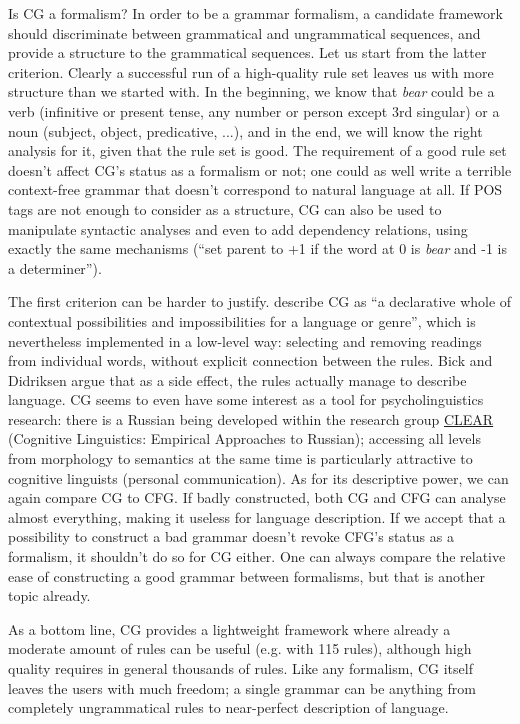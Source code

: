 Is CG a formalism? In order to be a grammar formalism, a candidate
framework should discriminate between grammatical and ungrammatical
sequences, and provide a structure to the grammatical sequences.
Let us start from the latter criterion. Clearly a successful run of a
high-quality rule set leaves us with more structure than we started
with. In the beginning, we know that \emph{bear} could be a verb
(infinitive or present tense, any number or person except 3rd
singular) or a noun (subject, object, predicative, ...), and in the end, we
will know the right analysis for it, given that the rule set is
good. The requirement of a good rule set doesn't affect CG's status as
a formalism or not; one could as well write a terrible context-free
grammar that doesn't correspond to natural language at all.
If POS tags are not enough to consider as a structure,
CG can also be used to manipulate syntactic analyses and even to add
dependency relations, using exactly the same mechanisms (``set parent to +1 if the word at 0 is \emph{bear} and -1 is a determiner'').

The first criterion can be harder to justify. \cite{bick2015} describe CG as ``a
declarative whole of contextual possibilities and impossibilities for
a language or genre'', which is nevertheless implemented in a
low-level way: selecting and removing readings from individual words,
without explicit connection between the rules. Bick and Didriksen
argue that as a side effect, the rules actually manage to describe language.
CG seems to even have some interest as a tool for psycholinguistics research:
there is a Russian being developed within the research group
 \href{https://uit.no/forskning/forskningsgrupper/gruppe?p_document_id=344365}{CLEAR
} (Cognitive Linguistics: Empirical Approaches to Russian); accessing
all levels from morphology to semantics at the same time is particularly attractive to cognitive linguists (personal communication).
As for its descriptive power, we can again compare CG to CFG. If
badly constructed, both CG and CFG can analyse almost everything,
making it useless for language description. If we accept that a
possibility to construct a bad grammar doesn't revoke CFG's status as
a formalism, it shouldn't do so for CG either. One can always compare
the relative ease of constructing a good grammar between formalisms,
but that is another topic already.

As a bottom line, CG provides a lightweight framework where already a
moderate amount of rules can be useful (e.g. \cite{lene_trond2011} with 115
rules), although high quality requires in general thousands of rules.
Like any formalism, CG itself leaves the users with much freedom; a
single grammar can be anything from completely ungrammatical rules to near-perfect description of language.


